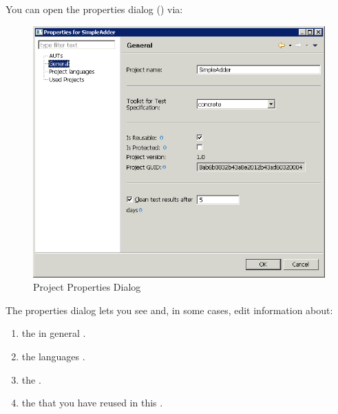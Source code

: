 

You can open the \gdproject{} properties dialog () via:\\

\begin{figure}[h]
\begin{center}
\includegraphics[width=12.5cm]{Tasks/Projects/PS/general_projproperties}
\caption{Project Properties Dialog}
\label{projectsettingsdialog}
\end{center}
\end{figure}

The \gdproject{} properties dialog  lets you see and, in some cases, edit information about:
\begin{enumerate}
\item the \gdproject{} in general .
\item the \gdproject{} languages .
\item the \gdauts{} .
\item the \gdprojects{} that you have reused in this \gdproject{} . 
\end{enumerate}

